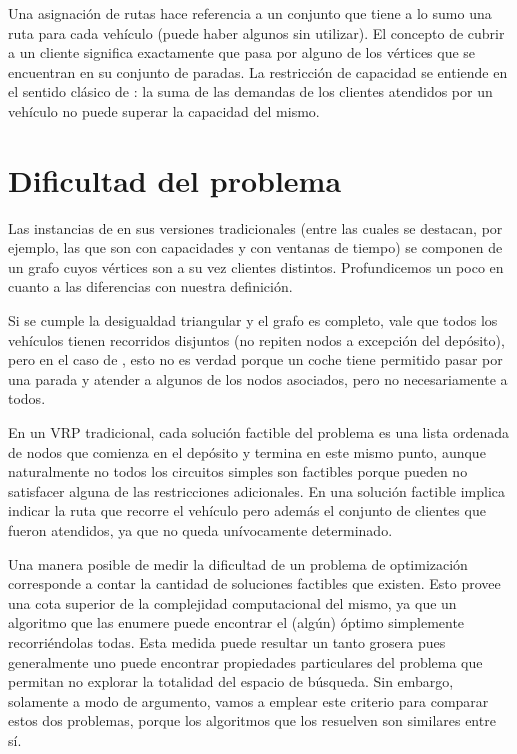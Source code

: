 Una asignación de rutas hace referencia a un conjunto que tiene a lo sumo una ruta para cada vehículo (puede haber algunos sin utilizar). El concepto de cubrir a un cliente significa exactamente que pasa por alguno de los vértices que se encuentran en su conjunto de paradas. La restricción de capacidad se entiende en el sentido clásico de : la suma de las demandas de los clientes atendidos por un vehículo no puede superar la capacidad del mismo. 

\section{Dificultad del problema}
\label{section:complexity}

Las instancias de  en sus versiones tradicionales (entre las cuales se destacan, por ejemplo, las que son con capacidades y con ventanas de tiempo) se componen de un grafo cuyos vértices son a su vez clientes distintos. Profundicemos un poco en cuanto a las diferencias con nuestra definición.

Si se cumple la desigualdad triangular y el grafo es completo, vale que todos los vehículos tienen recorridos disjuntos (no repiten nodos a excepción del depósito), pero en el caso de , esto no es verdad porque un coche tiene permitido pasar por una parada y atender a algunos de los nodos asociados, pero no necesariamente a todos. 

En un VRP tradicional, cada solución factible del problema es una lista ordenada de nodos que comienza en el depósito y termina en este mismo punto, aunque naturalmente no todos los circuitos simples son factibles porque pueden no satisfacer alguna de las restricciones adicionales. En  una solución factible implica indicar la ruta que recorre el vehículo pero además el conjunto de clientes que fueron atendidos, ya que no queda unívocamente determinado. 

Una manera posible de medir la dificultad de un problema de optimización corresponde a contar la cantidad de soluciones factibles que existen. Esto provee una cota superior de la complejidad computacional del mismo, ya que un algoritmo que las enumere puede encontrar el (algún) óptimo simplemente recorriéndolas todas. Esta medida puede resultar un tanto grosera pues generalmente uno puede encontrar propiedades particulares del problema que permitan no explorar la totalidad del espacio de búsqueda. Sin embargo, solamente a modo de argumento, vamos a emplear este criterio para comparar estos dos problemas, porque los algoritmos que los resuelven son similares entre sí.

